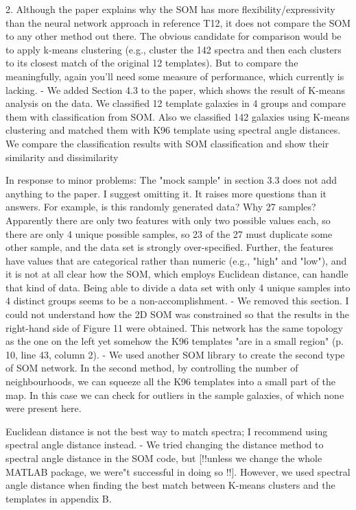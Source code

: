 2. Although the paper explains why the SOM has more flexibility/expressivity than the neural network approach in reference T12, it does not compare the SOM to any other method out there.  The obvious candidate for comparison would be to apply k-means clustering (e.g., cluster the 142 spectra and then each clusters to its closest match of the original 12 templates).  But to compare the meaningfully, again you'll need some measure of performance, which currently is lacking.
- We added Section 4.3 to the paper, which shows the result of K-means analysis on the data. 
	We classified 12 template galaxies in 4 groups and compare them with classification from SOM. 
	Also we classified 142 galaxies using K-means clustering and matched them with K96 template using spectral angle distances. We compare the classification results with SOM classification and show their similarity and dissimilarity

In response to minor problems:
The "mock sample" in section 3.3 does not add anything to the paper.  I suggest omitting it.  It raises more questions than it answers.  For example, is this randomly generated data?  Why 27 samples? Apparently there are only two features with only two possible values each, so there are only 4 unique possible samples, so 23 of the 27 must duplicate some other sample, and the data set is strongly over-specified.  Further, the features have values that are categorical rather than numeric (e.g., "high" and "low"), and it is not at all clear how the SOM, which employs Euclidean distance, can handle that kind of data.  Being able to divide a data set with only 4 unique samples into 4 distinct groups seems to be a non-accomplishment.
    - We removed this section. 
I could not understand how the 2D SOM was constrained so that the results in the right-hand side of Figure 11 were obtained.  This network has the same topology as the one on the left yet somehow the K96 templates "are in a small region" (p. 10, line 43, column 2).
-	We used another SOM library to create the second type of SOM network. In the second method, by controlling the number of neighbourhoods, we can squeeze all the K96 templates into a small part of the map. In this case we can check for outliers in the sample galaxies, of which none were present here.

Euclidean distance is not the best way to match spectra; I recommend using spectral angle distance instead.
-	We tried changing the distance method to spectral angle distance in the SOM code, but [!!unless we change the whole MATLAB package, we were"t successful in doing so !!]. However, we used spectral angle distance when finding the best match between K-means clusters and the templates in appendix B. 

